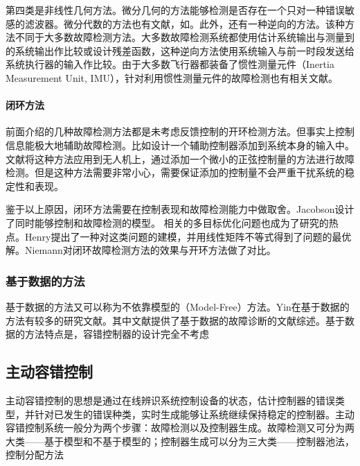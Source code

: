 \documentclass{article}
\begin{document}
第四类是非线性几何方法。微分几何的方法\cite{928586,Bokor2009113}能够检测是否存在一个只对一种错误敏感的滤波器\cite{Marzat2012modelbased}。微分代数的方法也有文献，如\cite{berdjag:hal-00198435}。此外，还有一种逆向的方法\cite{edelmayer2004input,doi:10.1080/00207170802582215,1102181}。该种方法不同于大多数故障检测方法。大多数故障检测系统都使用估计系统输出与测量到的系统输出作比较或设计残差函数，这种逆向方法使用系统输入与前一时段发送给系统执行器的输入作比较。由于大多数飞行器都装备了惯性测量元件（Inertia Measurement Unit, IMU），针对利用惯性测量元件的故障检测也有相关文献\cite{MARZAT2010951,5676073}。

\paragraph{闭环方法}前面介绍的几种故障检测方法都是未考虑反馈控制的开环检测方法。但事实上控制信息能极大地辅助故障检测。比如设计一个辅助控制器添加到系统本身的输入中\cite{NIEMANN2006587,ASHARI2009192}。文献\cite{ASHARI2009192,4602147}将这种方法应用到无人机上，通过添加一个微小的正弦控制量的方法进行故障检测。但是这种方法需要非常小心，需要保证添加的控制量不会严重干扰系统的稳定性和表现\cite{Niemann2006Active}。

鉴于以上原因，闭环方法需要在控制表现和故障检测能力中做取舍。Jacobson\cite{92987}设计了同时能够控制和故障检测的模型。 相关的多目标优化问题也成为了研究的热点。Henry\cite{Henry2005251}提出了一种对这类问题的建模，并用线性矩阵不等式得到了问题的最优解。Niemann\cite{649678}对闭环故障检测方法的效果与开环方法做了对比。

\subsubsection{基于数据的方法}\label{subsubsec:databased}
基于数据的方法又可以称为不依靠模型的（Model-Free）方法。Yin在基于数据的方法有较多的研究文献\cite{6717991,7394158,7067026,6748057,7297846,7407616}。其中文献\cite{6717991,6748057,7407616}提供了基于数据的故障诊断的文献综述。基于数据的方法特点是，容错控制器的设计完全不考虑

\subsection{主动容错控制}\label{subsec:active}
主动容错控制的思想是通过在线辨识系统控制设备的状态，估计控制器的错误类型，并针对已发生的错误种类，实时生成能够让系统继续保持稳定的控制器。主动容错控制系统一般分为两个步骤：故障检测以及控制器生成。故障检测又可分为两大类——基于模型和不基于模型的；控制器生成可以分为三大类——控制器池法，控制分配方法
\end{document}
